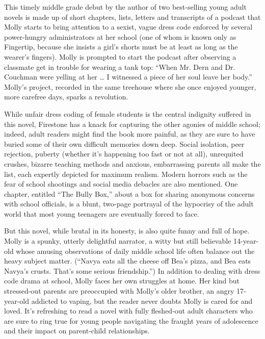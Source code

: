 This timely middle grade debut by the author of two best-selling young
adult novels is made up of short chapters, lists, letters and
transcripts of a podcast that Molly starts to bring attention to a
sexist, vague dress code enforced by several power-hungry administrators
at her school (one of whom is known only as Fingertip, because she
insists a girl's shorts must be at least as long as the wearer's
fingers). Molly is prompted to start the podcast after observing a
classmate get in trouble for wearing a tank top: ``When Mr. Dern and Dr.
Couchman were yelling at her \ldots{} I witnessed a piece of her soul
leave her body.'' Molly's project, recorded in the same treehouse where
she once enjoyed younger, more carefree days, sparks a revolution.

While unfair dress coding of female students is the central indignity
suffered in this novel, Firestone has a knack for capturing the other
agonies of middle school; indeed, adult readers might find the book more
painful, as they are sure to have buried some of their own difficult
memories down deep. Social isolation, peer rejection, puberty (whether
it's happening too fast or not at all), unrequited crushes, bizarre
teaching methods and anxious, embarrassing parents all make the list,
each expertly depicted for maximum realism. Modern horrors such as the
fear of school shootings and social media debacles are also mentioned.
One chapter, entitled ``The Bully Box,'' about a box for sharing
anonymous concerns with school officials, is a blunt, two-page portrayal
of the hypocrisy of the adult world that most young teenagers are
eventually forced to face.

But this novel, while brutal in its honesty, is also quite funny and
full of hope. Molly is a spunky, utterly delightful narrator, a witty
but still believable 14-year-old whose amusing observations of daily
middle school life often balance out the heavy subject matter. (``Navya
eats all the cheese off Bea's pizza, and Bea eats Navya's crusts. That's
some serious friendship.'') In addition to dealing with dress code drama
at school, Molly faces her own struggles at home. Her kind but
stressed-out parents are preoccupied with Molly's older brother, an
angry 17-year-old addicted to vaping, but the reader never doubts Molly
is cared for and loved. It's refreshing to read a novel with fully
fleshed-out adult characters who are sure to ring true for young people
navigating the fraught years of adolescence and their impact on
parent-child relationships.

